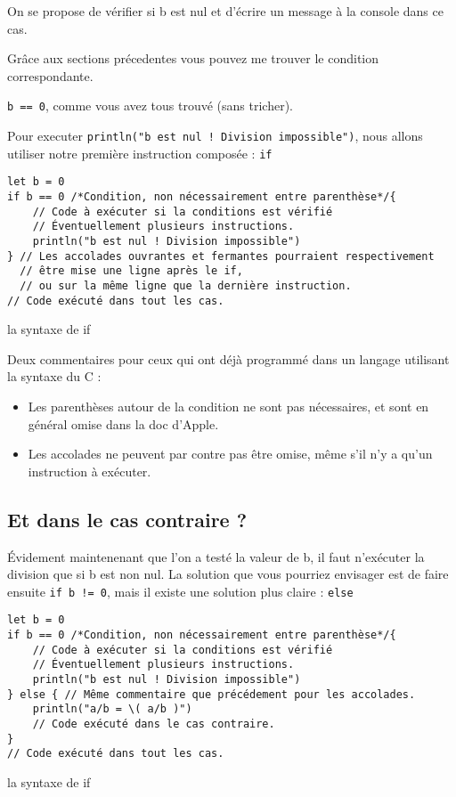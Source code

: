 On se propose de vérifier si b est nul et d'écrire un message à la console dans ce cas.

Grâce aux sections précedentes vous pouvez me trouver le condition correspondante.

\pagebreak %
\texttt{b == 0}, comme vous avez tous trouvé (sans tricher).

Pour executer \texttt{println("b est nul ! Division impossible")}, nous allons utiliser notre première instruction composée : \texttt{if}

\begin{listing}[h]
\begin{verbatim}
let b = 0
if b == 0 /*Condition, non nécessairement entre parenthèse*/{
    // Code à exécuter si la conditions est vérifié
    // Éventuellement plusieurs instructions.
    println("b est nul ! Division impossible")
} // Les accolades ouvrantes et fermantes pourraient respectivement
  // être mise une ligne après le if,
  // ou sur la même ligne que la dernière instruction.
// Code exécuté dans tout les cas.
\end{verbatim}
\caption{la syntaxe de if}
\end{listing}
Deux commentaires pour ceux qui ont déjà programmé
dans un langage utilisant la syntaxe du C :
\begin{itemize}
\item Les parenthèses autour de la condition ne sont pas nécessaires,
et sont en général omise dans la doc d'Apple.
\item Les accolades ne peuvent par contre pas être omise,
même s'il n'y a qu'un instruction à exécuter.
\end{itemize}
\subsection{Et dans le cas contraire ?}
Évidement maintenenant que l'on  a testé la valeur de b, il faut n'exécuter la division que si b est non nul.
La solution que vous pourriez envisager est de faire ensuite
\texttt{if b != 0},
mais il existe une solution plus claire : \texttt{else}
\begin{listing}[h]
\begin{verbatim}
let b = 0
if b == 0 /*Condition, non nécessairement entre parenthèse*/{
    // Code à exécuter si la conditions est vérifié
    // Éventuellement plusieurs instructions.
    println("b est nul ! Division impossible")
} else { // Même commentaire que précédement pour les accolades.
    println("a/b = \( a/b )")
    // Code exécuté dans le cas contraire.
}
// Code exécuté dans tout les cas.
\end{verbatim}
\caption{la syntaxe de if}
\end{listing} %

